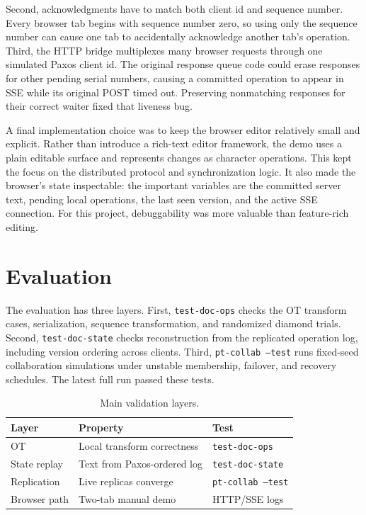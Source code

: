 \documentclass[11pt]{article}
\newcommand{\code}[1]{\texttt{#1}}
\begin{document}
Second, acknowledgments have to match both client id and sequence number. Every browser tab begins with sequence number zero, so using only the sequence number can cause one tab to accidentally acknowledge another tab's operation. Third, the HTTP bridge multiplexes many browser requests through one simulated Paxos client id. The original response queue code could erase responses for other pending serial numbers, causing a committed operation to appear in SSE while its original POST timed out. Preserving nonmatching responses for their correct waiter fixed that liveness bug.

A final implementation choice was to keep the browser editor relatively small and explicit. Rather than introduce a rich-text editor framework, the demo uses a plain editable surface and represents changes as character operations. This kept the focus on the distributed protocol and synchronization logic. It also made the browser's state inspectable: the important variables are the committed server text, pending local operations, the last seen version, and the active SSE connection. For this project, debuggability was more valuable than feature-rich editing.

\section{Evaluation}

The evaluation has three layers. First, \code{test-doc-ops} checks the OT transform cases, serialization, sequence transformation, and randomized diamond trials. Second, \code{test-doc-state} checks reconstruction from the replicated operation log, including version ordering across clients. Third, \code{pt-collab --test} runs fixed-seed collaboration simulations under unstable membership, failover, and recovery schedules. The latest full run passed these tests.

\begin{table}[h]
\centering
\small
\begin{tabular}{lll}
\toprule
\textbf{Layer} & \textbf{Property} & \textbf{Test}\\
\midrule
OT & Local transform correctness & \code{test-doc-ops}\\
State replay & Text from Paxos-ordered log & \code{test-doc-state}\\
Replication & Live replicas converge & \code{pt-collab --test}\\
Browser path & Two-tab manual demo & HTTP/SSE logs\\
\bottomrule
\end{tabular}
\caption{Main validation layers.}
\end{table}
\end{document}
